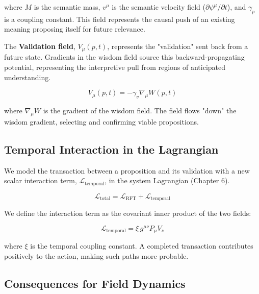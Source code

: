 where \(M\) is the semantic mass, \(v^\mu\) is the semantic velocity field (\(\partial\psi^\mu/\partial t\)), and \(\gamma_p\) is a coupling constant. This field represents the causal push of an existing meaning proposing itself for future relevance.

The \textbf{Validation field}, \(V_\mu(p,t)\), represents the "validation" sent back from a future state. Gradients in the wisdom field source this backward-propagating potential, representing the interpretive pull from regions of anticipated understanding.

\begin{equation}
V_\mu(p,t) = -\gamma_v \nabla_\mu W(p,t)
\end{equation}

where \(\nabla_\mu W\) is the gradient of the wisdom field. The field flows "down" the wisdom gradient, selecting and confirming viable propositions.


\subsection{Temporal Interaction in the Lagrangian}
\label{9.6.3:temporal_interaction_in_the_lagrangian}

We model the transaction between a proposition and its validation with a new scalar interaction term, \(\mathcal{L}_{\text{temporal}}\), in the system Lagrangian (Chapter 6).

\begin{equation}
\mathcal{L}_{\text{total}} = \mathcal{L}_{\text{RFT}} + \mathcal{L}_{\text{temporal}}
\end{equation}

We define the interaction term as the covariant inner product of the two fields:

\begin{equation}
\mathcal{L}_{\text{temporal}} = \xi \, g^{\mu\nu} P_{\mu} V_{\nu}
\end{equation}

where \(\xi\) is the temporal coupling constant. A completed transaction contributes positively to the action, making such paths more probable.


\subsection{Consequences for Field Dynamics}
\label{9.6.4:consequences_for_field_dynamics}

